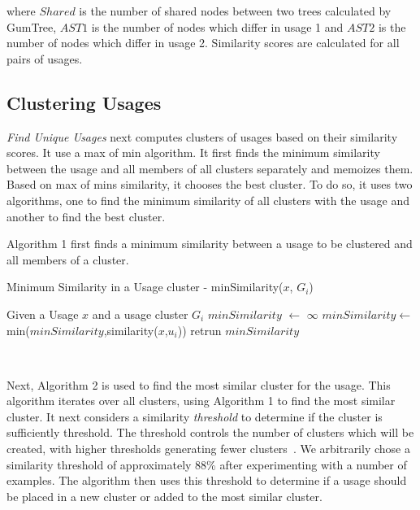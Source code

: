 \documentclass[conference]{IEEEtran}
\begin{document}
\noindent where $Shared$ is the number of shared nodes between two trees calculated by GumTree, $AST1$ is the number of nodes which differ in usage  1 and $AST2$ is the number of nodes which differ in usage 2.
Similarity scores are calculated for all pairs of usages. 

\subsection{Clustering Usages}
\textit{Find Unique Usages} next computes clusters of usages based on their similarity scores. It use a max of min algorithm. It first finds the minimum similarity between the usage and all members of all clusters separately and memoizes them. Based on max of mins similarity, it chooses the best cluster. To do so, it uses two algorithms, one to find the minimum similarity of all clusters with the usage and another to find the best cluster.\par 

Algorithm 1 first finds a minimum similarity between a usage to be clustered and all members of a cluster.\par

\begin{algorithm}
\label{algo1}
    \caption{Minimum Similarity in a Usage cluster - minSimilarity($x$, $G_{i}$)} 
    \begin{algorithmic}[1]
    \State Given a Usage $x$ and a usage cluster $G_{i}$
    \State $minSimilarity$ $\leftarrow$ $\infty$
    \State $minSimilarity$$\leftarrow$min($minSimilarity$,similarity($x$,$u_{i}$)) \EndFor
   \State retrun $minSimilarity$
    \end{algorithmic} 
     \
\end{algorithm}

Next, Algorithm 2 is used to find the most similar cluster for the usage. This algorithm iterates over all clusters, using Algorithm 1 to find the most similar cluster. It next considers a similarity \textit{threshold} to determine if the cluster is sufficiently threshold. The threshold controls the number of clusters which will be created, with higher thresholds generating fewer clusters~\cite{deng2013top}. 
We arbitrarily chose a similarity threshold of approximately 88\% after experimenting with a number of examples. The algorithm then uses this threshold to determine if a usage should be placed in a new cluster or added to the most similar cluster. 
\end{document}
